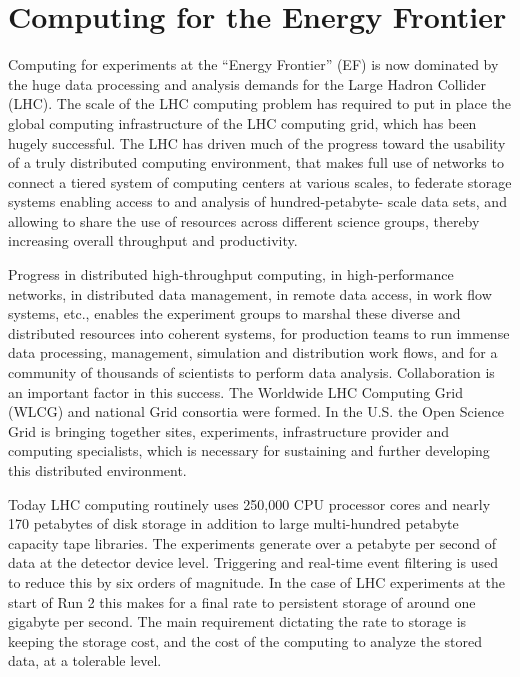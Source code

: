 \section{Computing for the Energy Frontier}

Computing for experiments at the ``Energy Frontier'' (EF) is now dominated by
the huge data processing and analysis demands for the Large Hadron Collider
(LHC). The scale of the LHC computing problem has required to put in place the
global computing infrastructure of the LHC computing grid, which has been
hugely successful.  The LHC has driven much of the progress toward the
usability of a truly distributed computing environment, that makes full use of
networks to connect a tiered system of computing centers at various scales, to
federate storage systems enabling access to and analysis of hundred-petabyte-
scale data sets, and allowing to share the use of resources across different
science groups, thereby increasing overall throughput and productivity.

Progress in distributed high-throughput computing, in high-performance
networks, in distributed data management, in remote data access, in work flow
systems, etc., enables the experiment groups to marshal these diverse and
distributed resources into coherent systems, for production teams to run
immense data processing, management, simulation and distribution work flows,
and for a community of thousands of scientists to perform data analysis.
Collaboration is an important factor in this success. The Worldwide LHC
Computing Grid (WLCG)  and national Grid consortia were formed. In the U.S.
the Open Science Grid is  bringing together sites, experiments, infrastructure
provider and computing specialists, which is necessary for  sustaining and
further developing this distributed environment.

Today LHC computing routinely uses 250,000 CPU processor cores and nearly 170
petabytes of disk storage in addition to large multi-hundred petabyte capacity
tape libraries.  The experiments generate over a petabyte per second of data
at the detector device level. Triggering and real-time event filtering  is
used to reduce this by six orders of magnitude. In the case of LHC experiments
at the start of Run 2 this makes for a final rate to persistent storage of
around one gigabyte per second. The main requirement dictating the rate to
storage is keeping the storage cost, and the  cost of the computing to analyze
the stored data, at a tolerable level.

